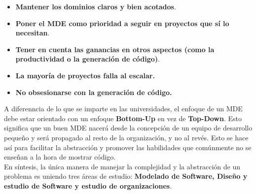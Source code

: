 \begin{itemize}
  \item{\textbf{Mantener los dominios claros y bien
        acotados}.}
  \item{\textbf{Poner el MDE como prioridad a seguir en
  proyectos que sí lo necesitan}.}
  \item{\textbf{Tener en cuenta las ganancias en otros
        aspectos
    (como la productividad o la generación de código)}.}
  \item{\textbf{La mayoría de proyectos falla al escalar.}}
  \item{\textbf{No obsesionarse con la generación de
        código.}}
\end{itemize}

A diferenncia de lo que se imparte en las universidades, el
enfoque de un MDE debe estar orientado con un enfoque
\textbf{Bottom-Up} en vez de \textbf{Top-Down}. Esto
significa que un buen MDE nacerá desde la concepción de un
equipo de desarrollo pequeño y será propagado al resto de la
organización, y no al revés. Esto se hace así para facilitar
la abstracción y promover las habilidades que comúnmente no
se enseñan a la hora de mostrar código. \\

En síntesis, la única manera de manejar la complejidad y la
abstracción de un problema es uniendo tres áreas de estudio:
\textbf{Modelado de Software, Diseño y estudio de Software y
  estudio de organizaciones}.
